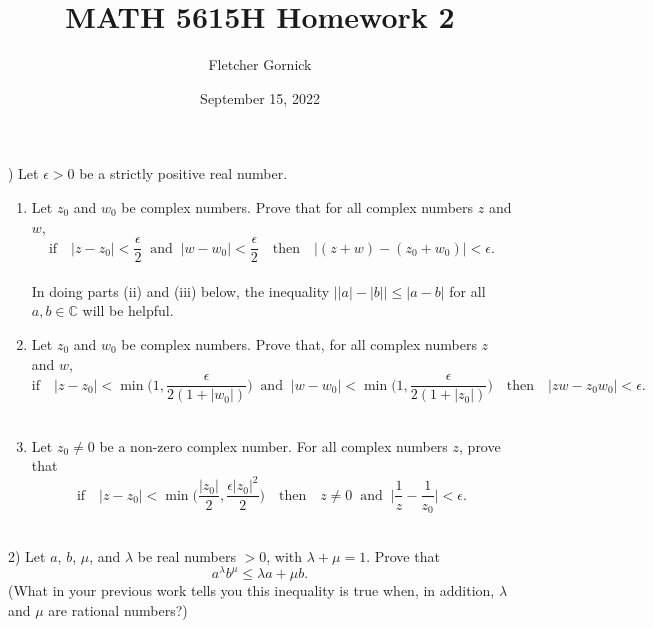 \documentclass[11pt]{article}
\title{\vspace{-1.0cm}MATH 5615H Homework 2}
\author{Fletcher Gornick}
\date{September 15, 2022}
\begin{document}
 ) Let \(\epsilon > 0\) be a strictly positive real number. \\
  \begin{enumerate}[label=(\roman*)]
    \item Let \(z_0\) and \(w_0\) be complex numbers.  Prove that for all complex numbers \(z\) and \(w\),
      \[
        \text{if} \quad |z - z_0| < \frac{\epsilon}{2} \;\; 
        \text{and} \;\; |w - w_0| < \frac{\epsilon}{2} \quad 
        \text{then} \quad |(z + w) - (z_0 + w_0)| < \epsilon.
      \] \\

      In doing parts (ii) and (iii) below, the inequality \(\big||a| - |b|\big| \leq |a - b|\) for all \(a, b \in \mathbb{C}\)
      will be helpful.

    \item Let \(z_0\) and \(w_0\) be complex numbers.  Prove that, for all complex numbers \(z\) and \(w\),
      \[
        \text{if} \quad |z - z_0| < \min\Big(1, \frac{\epsilon}{2(1 + |w_0|)}\Big) \;\;
        \text{and} \;\; |w - w_0| < \min\Big(1, \frac{\epsilon}{2(1 + |z_0|)}\Big) \quad
        \text{then} \quad |zw - z_0w_0| < \epsilon.
      \] \\

    \item Let \(z_0 \neq 0\) be a non-zero complex number.  For all complex numbers \(z\), prove that
      \[
        \text{if} \quad |z - z_0| < \min\bigg(\frac{|z_0|}{2}, \frac{\epsilon|z_0|^2}{2}\bigg) \quad
        \text{then} \quad z \neq 0 \;\; \text{and} \;\; \Big|\frac{1}{z} - \frac{1}{z_0}\Big| < \epsilon.
      \] \\
  \end{enumerate}
  \newpage

  2) Let \(a\), \(b\), \(\mu\), and \(\lambda\) be real numbers \(> 0\), with \(\lambda + \mu = 1\).  Prove that
  \[a^\lambda b^\mu \leq \lambda a + \mu b.\]
  (What in your previous work tells you this inequality is true when, in addition, \(\lambda\) and \(\mu\) are rational 
  numbers?)
\end{document}
